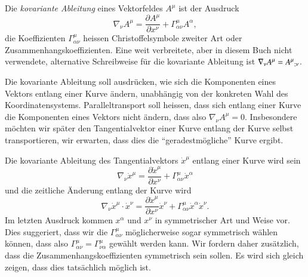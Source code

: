 \begin{definition}
Die {\em kovariante Ableitung} eines Vektorfeldes $A^\mu$ ist der 
%
%
Ausdruck
\begin{equation}
\nabla_\nu A^\mu
=
\frac{\partial A^\mu}{\partial x^\nu}
+
\Gamma^\mu_{\alpha\nu}A^\alpha,
\label{skript:geodaeten:kovarianteableitung}
\end{equation}
die Koeffizienten $\Gamma^\mu_{\alpha\nu}$ heissen Christoffelsymbole
zweiter Art oder Zusammenhangskoeffizienten.
Eine weit verbreitete, aber in diesem Buch nicht verwendete,
alternative Schreibweise für die kovariante Ableitung ist
$
\nabla_\nu A^\mu
=
A^\mu\mathstrut_{;\nu}
$.
\end{definition}

Die kovariante Ableitung soll ausdrücken, wie sich die Komponenten eines
Vektors entlang einer Kurve ändern, unabhängig von der konkreten Wahl
des Koordinatensystems.
Paralleltransport soll heissen, dass sich entlang einer Kurve die
Komponenten eines Vektors nicht ändern,
dass also $\nabla_\nu A^\mu=0$.
Insbesondere möchten wir später den Tangentialvektor einer Kurve entlang
der Kurve selbst transportieren, wir erwarten, dass dies die 
``geradestmögliche'' Kurve ergibt.

Die kovariante Ableitung des Tangentialvektors $\dot x^\mu$ entlang
einer Kurve wird sein
\[
\nabla_\nu\dot x^\mu
=
\frac{\partial \dot x^\mu}{\partial x^\nu}
+
\Gamma^\mu_{\alpha\nu}\dot x^\alpha
\]
und die zeitliche Änderung entlang der Kurve wird
\[
\nabla_\nu\dot x^\mu\cdot \dot x^\nu
=
\frac{\partial \dot x^\mu}{\partial x^\nu}\dot x^\nu
+
\Gamma^\mu_{\alpha\nu}\dot x^\alpha \dot x^\nu.
\]
Im letzten Ausdruck kommen $x^\alpha$ und $x^\nu$ in symmetrischer
Art und Weise vor.
Dies suggeriert, dass wir die $\Gamma^\mu_{\alpha\nu}$ möglicherweise
sogar symmetrisch wählen können, dass also
$\Gamma^\mu_{\alpha\nu}=\Gamma^\mu_{\nu\alpha}$
gewählt werden kann.
Wir fordern daher zusätzlich, dass die Zusammenhangskoeffizienten
symmetrisch sein sollen.
Es wird sich gleich zeigen, dass dies tatsächlich möglich ist.

